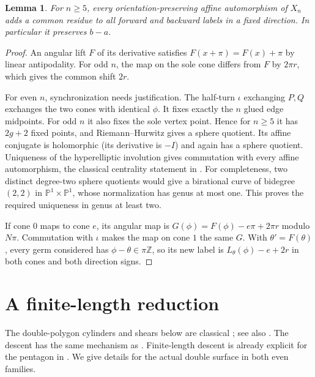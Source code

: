 \documentclass[11pt]{article}
\newtheorem{lemma}[theorem]{Lemma}
\newcommand{\Z}{\mathbb Z}
\begin{document}
\begin{lemma}\label{shift}
For $n\ge5$, every orientation-preserving affine automorphism of $X_n$
adds a common residue to all forward and backward labels in a fixed
direction. In particular it preserves $b-a$.
\end{lemma}
\begin{proof}
An angular lift $F$ of its derivative satisfies
$F(x+\pi)=F(x)+\pi$ by linear antipodality.
For odd $n$, the map on the sole cone differs from $F$ by $2\pi r$,
which gives the common shift $2r$.

For even $n$, synchronization needs justification. The half-turn
$\iota$ exchanging $P,Q$ exchanges the two cones with identical $\phi$.
It fixes exactly the $n$ glued edge midpoints. For odd $n$ it also fixes
the sole vertex point. Hence for $n\ge5$ it has $2g+2$ fixed points,
and Riemann--Hurwitz gives a sphere quotient.
Its affine conjugate is holomorphic (its derivative is $-I$) and again
has a sphere quotient. Uniqueness of the hyperelliptic involution
gives commutation with every affine automorphism, the classical
centrality statement in \cite[Lemma~2.3]{BL}.
For completeness, two distinct degree-two sphere quotients would give
a birational curve of bidegree $(2,2)$ in
$\mathbb P^1\times\mathbb P^1$, whose normalization has genus at most one.
This proves the required uniqueness in genus at least two.

If cone $0$ maps to cone $e$, its angular map is
$G(\phi)=F(\phi)-e\pi+2\pi r$ modulo $N\pi$.
Commutation with $\iota$ makes the map on cone $1$ the same $G$.
With $\theta'=F(\theta)$, every germ considered has
$\phi-\theta\in\pi\Z$, so its new label is
$L_\theta(\phi)-e+2r$ in both cones and both direction signs.
\end{proof}

\section{A finite-length reduction}

The double-polygon cylinders and shears below are classical
\cite[\S5]{Veech}; see also \cite[\S3.1]{Finster}.
The descent has the same mechanism as \cite[Lemmas~2.8--2.13]{Ferudun}.
Finite-length descent is already explicit for the pentagon in
\cite[Theorem~2.11]{DL}.
We give details for the actual double surface in both even families.
\end{document}
